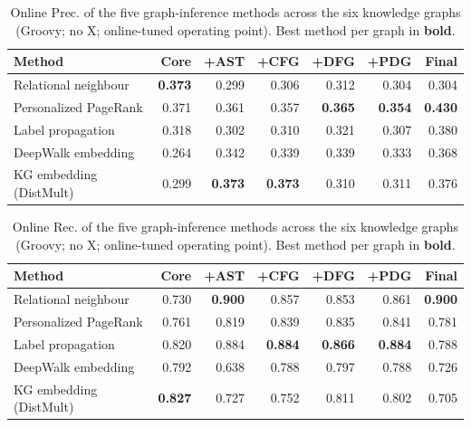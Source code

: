\begin{table}[H]
\centering \small
\caption{Online Prec. of the five graph-inference methods across the six knowledge graphs (Groovy; no X; online-tuned operating point). Best method per graph in \textbf{bold}.}
\label{tab:v4-final-precision}
\begin{tabular}{lrrrrrr}
\toprule
Method & Core & +AST & +CFG & +DFG & +PDG & Final \\
\midrule
Relational neighbour & \textbf{0.373} & 0.299 & 0.306 & 0.312 & 0.304 & 0.304 \\
Personalized PageRank & 0.371 & 0.361 & 0.357 & \textbf{0.365} & \textbf{0.354} & \textbf{0.430} \\
Label propagation & 0.318 & 0.302 & 0.310 & 0.321 & 0.307 & 0.380 \\
DeepWalk embedding & 0.264 & 0.342 & 0.339 & 0.339 & 0.333 & 0.368 \\
KG embedding (DistMult) & 0.299 & \textbf{0.373} & \textbf{0.373} & 0.310 & 0.311 & 0.376 \\
\bottomrule
\end{tabular}
\end{table}

\begin{table}[H]
\centering \small
\caption{Online Rec. of the five graph-inference methods across the six knowledge graphs (Groovy; no X; online-tuned operating point). Best method per graph in \textbf{bold}.}
\label{tab:v4-final-recall}
\begin{tabular}{lrrrrrr}
\toprule
Method & Core & +AST & +CFG & +DFG & +PDG & Final \\
\midrule
Relational neighbour & 0.730 & \textbf{0.900} & 0.857 & 0.853 & 0.861 & \textbf{0.900} \\
Personalized PageRank & 0.761 & 0.819 & 0.839 & 0.835 & 0.841 & 0.781 \\
Label propagation & 0.820 & 0.884 & \textbf{0.884} & \textbf{0.866} & \textbf{0.884} & 0.788 \\
DeepWalk embedding & 0.792 & 0.638 & 0.788 & 0.797 & 0.788 & 0.726 \\
KG embedding (DistMult) & \textbf{0.827} & 0.727 & 0.752 & 0.811 & 0.802 & 0.705 \\
\bottomrule
\end{tabular}
\end{table}

